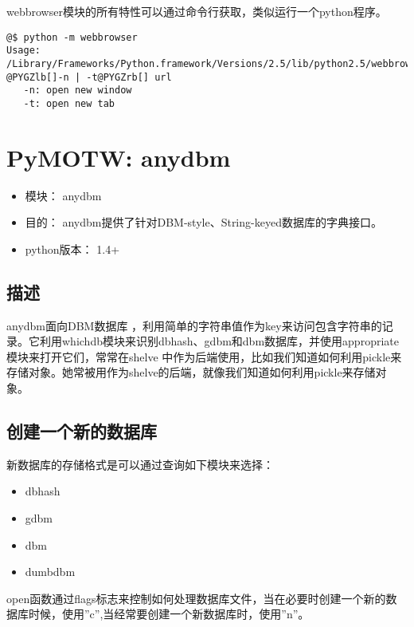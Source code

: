\documentclass[a4paper,10pt,english]{manual}
\begin{document}
webbrowser模块的所有特性可以通过命令行获取，类似运行一个python程序。

\begin{Verbatim}[commandchars=@\[\]]
@$ python -m webbrowser
Usage: /Library/Frameworks/Python.framework/Versions/2.5/lib/python2.5/webbrowser.py @PYGZlb[]-n | -t@PYGZrb[] url
   -n: open new window
   -t: open new tab
\end{Verbatim}

\resetcurrentobjects


\chapter{PyMOTW: anydbm}
\begin{itemize}
\item {} 
模块： anydbm

\item {} 
目的： anydbm提供了针对DBM-style、String-keyed数据库的字典接口。

\item {} 
python版本： 1.4+

\end{itemize}


\section{描述}

anydbm面向DBM数据库 ，利用简单的字符串值作为key来访问包含字符串的记录。它利用whichdb模块来识别dbhash、gdbm和dbm数据库，并使用appropriate模块来打开它们，常常在shelve 中作为后端使用，比如我们知道如何利用pickle来存储对象。她常被用作为shelve的后端，就像我们知道如何利用pickle来存储对象。


\section{创建一个新的数据库}

新数据库的存储格式是可以通过查询如下模块来选择：
\begin{itemize}
\item {} 
dbhash

\item {} 
gdbm

\item {} 
dbm

\item {} 
dumbdbm

\end{itemize}

open函数通过flags标志来控制如何处理数据库文件，当在必要时创建一个新的数据库时候，使用''c'',当经常要创建一个新数据库时，使用''n''。
\end{document}
